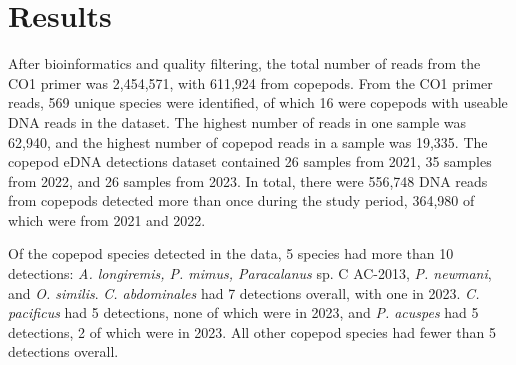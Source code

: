 \documentclass[12pt,twoside]{reedthesis}
\begin{document}
	\chapter{Results}
	
	
	After bioinformatics and quality filtering, the total number of reads from the CO1 primer was 2,454,571, with 611,924 from copepods. From the CO1 primer reads, 569 unique species were identified, of which 16 were copepods with useable DNA reads in the dataset. The highest number of reads in one sample was 62,940, and the highest number of copepod reads in a sample was 19,335. The copepod eDNA detections dataset contained 26 samples from 2021, 35 samples from 2022, and 26 samples from 2023. In total, there were 556,748 DNA reads from copepods detected more than once during the study period, 364,980 of which were from 2021 and 2022. 
	
	Of the copepod species detected in the data, 5 species had more than 10 detections: \textit{A. longiremis, P. mimus, Paracalanus} sp. C AC-2013, \textit{P. newmani}, and \textit{O. similis}. \textit{C. abdominales} had 7 detections overall, with one in 2023. \textit{C. pacificus} had 5 detections, none of which were in 2023, and \textit{P. acuspes} had 5 detections, 2 of which were in 2023. All other copepod species had fewer than 5 detections overall.
	
	
	
	
\end{document}
